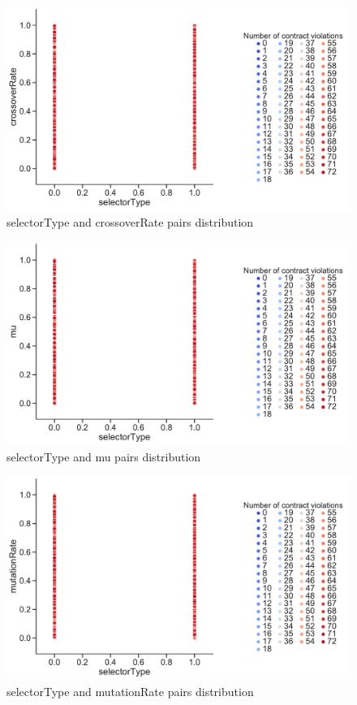 \begin{figure}
	\centering
	\includegraphics[width=\textwidth]{images/PairsDistr/selectorType_crossoverRate.pdf}
	\caption[selectorType and crossoverRate pairs distribution]{selectorType and crossoverRate pairs distribution}  
	\label{fig:selectorType_crossoverRate_pair}
\end{figure}
\clearpage
\begin{figure}
	\centering
	\includegraphics[width=\textwidth]{images/PairsDistr/selectorType_mu.pdf}
	\caption[selectorType and mu pairs distribution]{selectorType and mu pairs distribution}
	\label{fig:selectorType_mu_pair}
\end{figure}
\clearpage
\begin{figure}
	\centering
	\includegraphics[width=\textwidth]{images/PairsDistr/selectorType_mutationRate.pdf}
	\caption[selectorType and mutationRate pairs distribution]{selectorType and mutationRate pairs distribution}
	\label{fig:selectorType_mutationRate_pair}
\end{figure}
